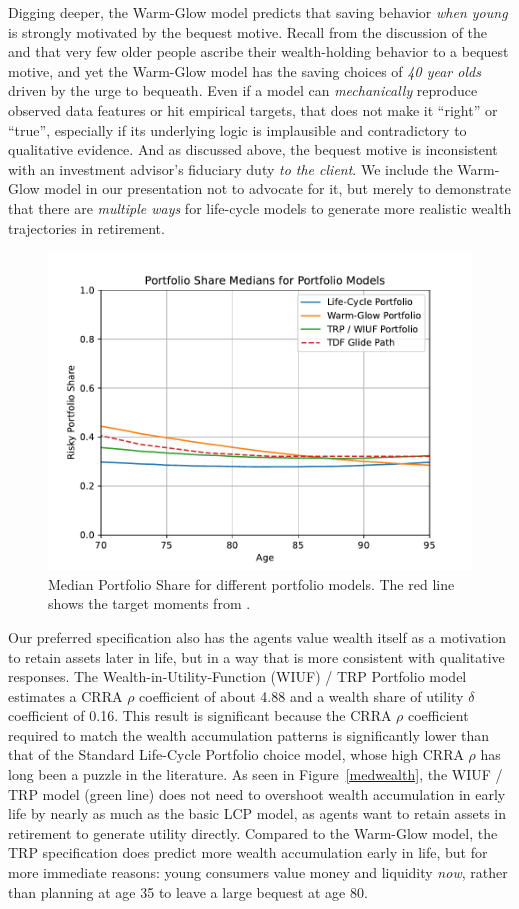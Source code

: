 \documentclass{article}
\newcommand{\CRRA}{\rho}
\begin{document}
Digging deeper, the Warm-Glow model predicts that saving behavior \textit{when young} is strongly motivated by the bequest motive.
Recall from the discussion of the \cite{2023} and \cite{jaherGilded} that very few older people ascribe their wealth-holding behavior to a bequest motive, and yet the Warm-Glow model has the saving choices of \textit{40 year olds} driven by the urge to bequeath.
Even if a model can \textit{mechanically} reproduce observed data features or hit empirical targets, that does not make it ``right'' or ``true'', especially if its underlying logic is implausible and contradictory to qualitative evidence.
And as discussed above, the bequest motive is inconsistent with an investment advisor's fiduciary duty \textit{to the client}.
We include the Warm-Glow model in our presentation not to advocate for it, but merely to demonstrate that there are \textit{multiple ways} for life-cycle models to generate more realistic wealth trajectories in retirement.

\begin{figure}[!htbp]
\centering
\includegraphics[width=0.7\linewidth]{files/median_share-88a10bbb141cc4512a67a2e4e71afa58.pdf}
\caption[]{Median Portfolio Share for different portfolio models. The red line shows the target moments from \cite{Aboagye2024}.}
\label{medshare}
\end{figure}

Our preferred specification also has the agents value wealth itself as a motivation to retain assets later in life, but in a way that is more consistent with qualitative responses.
The Wealth-in-Utility-Function (WIUF) / TRP Portfolio model estimates a CRRA $\CRRA$ coefficient of about 4.88 and a wealth share of utility $\delta$ coefficient of 0.16.
This result is significant because the CRRA $\CRRA$ coefficient required to match the wealth accumulation patterns is significantly lower than that of the Standard Life-Cycle Portfolio choice model, whose high CRRA $\CRRA$ has long been a puzzle in the literature.
As seen in Figure~\ref{medwealth}, the WIUF / TRP model (green line) does not need to overshoot wealth accumulation in early life by nearly as much as the basic LCP model, as agents want to retain assets in retirement to generate utility directly.
Compared to the Warm-Glow model, the TRP specification does predict more wealth accumulation early in life, but for more immediate reasons: young consumers value money and liquidity \textit{now}, rather than planning at age 35 to leave a large bequest at age 80.
\end{document}
